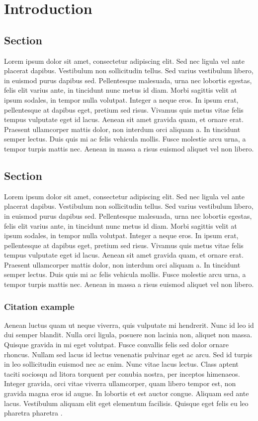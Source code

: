 \chapter{Introduction}
\section{Section}
Lorem ipsum dolor sit amet, consectetur adipiscing elit. Sed nec ligula vel
ante placerat dapibus. Vestibulum non sollicitudin tellus. Sed varius
vestibulum libero, in euismod purus dapibus sed. Pellentesque malesuada, urna
nec lobortis egestas, felis elit varius ante, in tincidunt nunc metus id diam.
Morbi sagittis velit at ipsum sodales, in tempor nulla volutpat. Integer a
neque eros. In ipsum erat, pellentesque at dapibus eget, pretium sed risus.
Vivamus quis metus vitae felis tempus vulputate eget id lacus. Aenean sit amet
gravida quam, et ornare erat. Praesent ullamcorper mattis dolor, non interdum
orci aliquam a. In tincidunt semper lectus. Duis quis mi ac felis vehicula
mollis. Fusce molestie arcu urna, a tempor turpis mattis nec. Aenean in massa a
risus euismod aliquet vel non libero.

\section{Section}
Lorem ipsum dolor sit amet, consectetur adipiscing elit. Sed nec ligula vel
ante placerat dapibus. Vestibulum non sollicitudin tellus. Sed varius
vestibulum libero, in euismod purus dapibus sed. Pellentesque malesuada, urna
nec lobortis egestas, felis elit varius ante, in tincidunt nunc metus id diam.
Morbi sagittis velit at ipsum sodales, in tempor nulla volutpat. Integer a
neque eros. In ipsum erat, pellentesque at dapibus eget, pretium sed risus.
Vivamus quis metus vitae felis tempus vulputate eget id lacus. Aenean sit amet
gravida quam, et ornare erat. Praesent ullamcorper mattis dolor, non interdum
orci aliquam a. In tincidunt semper lectus. Duis quis mi ac felis vehicula
mollis. Fusce molestie arcu urna, a tempor turpis mattis nec. Aenean in massa a
risus euismod aliquet vel non libero.

\subsection{Citation example}
Aenean luctus quam ut neque viverra, quis vulputate mi hendrerit. Nunc id leo
id dui semper blandit. Nulla orci ligula, posuere non lacinia non, aliquet non
massa. Quisque gravida in mi eget volutpat. Fusce convallis felis sed dolor
ornare rhoncus. Nullam sed lacus id lectus venenatis pulvinar eget ac arcu. Sed
id turpis in leo sollicitudin euismod nec ac enim. Nunc vitae lacus lectus.
Class aptent taciti sociosqu ad litora torquent per conubia nostra, per
inceptos himenaeos. Integer gravida, orci vitae viverra ullamcorper, quam
libero tempor est, non gravida magna eros id augue. In lobortis et est auctor
congue. Aliquam sed ante lacus. Vestibulum aliquam elit eget elementum
facilisis. Quisque eget felis eu leo pharetra pharetra
\cite{spa:logical_interface}.

